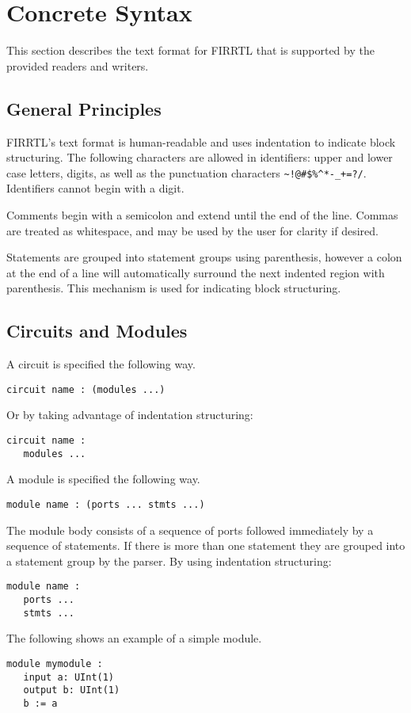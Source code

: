 \documentclass[12pt]{article}
\begin{document}
\section{Concrete Syntax}\label{concrete}
This section describes the text format for FIRRTL that is supported by the provided readers and writers.

\subsection*{General Principles}
FIRRTL's text format is human-readable and uses indentation to indicate block structuring. The following characters are allowed in identifiers: upper and lower case letters, digits, as well as the punctuation characters \verb|~!@#$%^*-_+=?/|. Identifiers cannot begin with a digit. 

Comments begin with a semicolon and extend until the end of the line. Commas are treated as whitespace, and may be used by the user for clarity if desired. 

Statements are grouped into statement groups using parenthesis, however a colon at the end of a line will automatically surround the next indented region with parenthesis. This mechanism is used for indicating block structuring. 

\subsection*{Circuits and Modules}
A circuit is specified the following way.
\begin{verbatim}
circuit name : (modules ...)
\end{verbatim}
Or by taking advantage of indentation structuring:
\begin{verbatim}
circuit name :
   modules ...
\end{verbatim}

A module is specified the following way.
\begin{verbatim}
module name : (ports ... stmts ...)
\end{verbatim}
The module body consists of a sequence of ports followed immediately by a sequence of statements. If there is more than one statement they are grouped into a statement group by the parser. 
By using indentation structuring:
\begin{verbatim}
module name :
   ports ...
   stmts ...
\end{verbatim}

The following shows an example of a simple module.
\begin{verbatim}
module mymodule :
   input a: UInt(1)
   output b: UInt(1)
   b := a
\end{verbatim}
\end{document}
